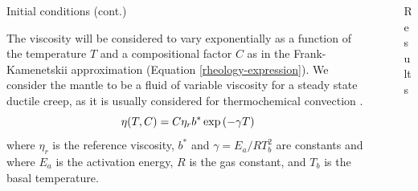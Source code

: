 \documentclass[final]{beamer}
\newlength{\sepwidth}
\newlength{\colwidth}
\newcommand{\separatorcolumn}{\begin{column}{\sepwidth}\end{column}}
\begin{document}
\begin{frame}[t]
\begin{columns}[t]
\begin{column}{\colwidth}
\begin{block}{Initial conditions (cont.)}


    \heading{\textcolor{darkblue}{Rheology model}}
    
      The viscosity will be considered to vary exponentially as a function of the temperature $T$ and a compositional factor $C$ as in the Frank-Kamenetskii approximation (Equation \ref{rheology-expression}). We consider the mantle to be a fluid of variable viscosity for a steady state ductile creep, as it is usually considered for thermochemical convection \cite{solomatov2000scaling}.
      \begin{equation}{\label{rheology-expression}}
       \eta(T,C) = C\eta_r b^* \exp{(-\gamma T)}
      \end{equation}
      \noindent where $\eta_r$ is the reference viscosity, $b^*$ and $\gamma=E_{a}/RT_{b}^{2}$ are constants and where $E_a$ is the activation energy, $R$ is the gas constant, and $T_b$ is the basal temperature.
        
  \end{block}
\end{column}


\separatorcolumn

\begin{column}{\colwidth}

  \begin{block}{Results}


\end{block}
\end{column}
\end{columns}
\end{frame}
\end{document}
